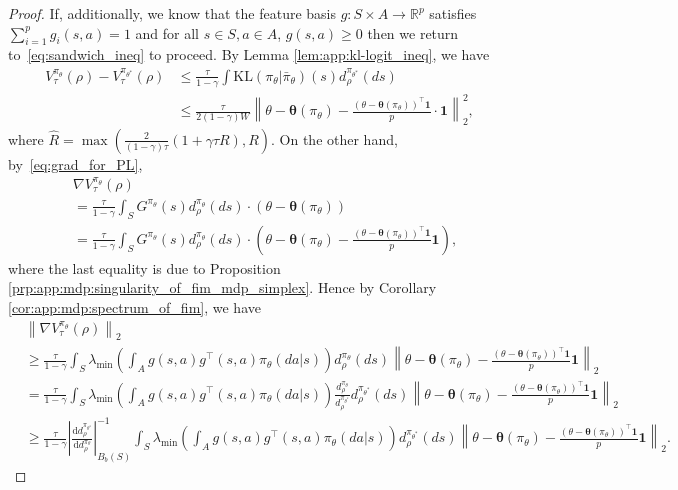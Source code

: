 \documentclass{amsart}
\theoremstyle{definition}
\begin{document}
\begin{proof}
If, additionally,  we know that the feature basis $g:S\times A \to \mathbb R^p$ satisfies $\sum_{i=1}^p g_i(s,a) = 1 $ and for all $s \in S,a \in A$, $g(s,a) \geq 0$ then we return to~\eqref{eq:sandwich_ineq} to proceed.
By Lemma \ref{lem:app:kl-logit_ineq}, we have
\begin{align*}
V_\tau^{\pi_\theta}(\rho) - V_\tau^{\pi_{\theta^*}}(\rho) & \leq \frac{\tau}{1-\gamma}\int \mathrm{KL}(\pi_\theta | \bar{\pi}_{\theta})(s)d_\rho^{\pi_{\theta^*}}(ds)\\
& \leq \frac{\tau }{2(1-\gamma)W}\left\|\theta - \boldsymbol{\theta}(\pi_\theta) - \frac{(\theta - \boldsymbol{\theta}(\pi_\theta))^\top \textbf{1}}{p} \cdot \textbf{1}\right\|_{2}^2,
\end{align*}
where $\hat{R} = \max\left(\frac{2}{(1-\gamma)\tau} \left(1+\gamma\tau R\right), R\right)$.
On the other hand, by~\eqref{eq:grad_for_PL},
\begin{align*}
& \nabla V_\tau^{\pi_\theta}(\rho) \\
& = \frac{\tau}{1-\gamma} \int_{S} G^{\pi_\theta}(s)d_{\rho}^{\pi_{\theta}}(ds)\cdot(\theta -\boldsymbol{\theta}(\pi_\theta))\\
& = \frac{\tau}{1-\gamma} \int_{S} G^{\pi_\theta}(s)d_{\rho}^{\pi_{\theta}}(ds)\cdot\left(\theta -\boldsymbol{\theta}(\pi_\theta)- \frac{(\theta - \boldsymbol{\theta}(\pi_\theta))^\top\textbf{1}}{p}\textbf{1}\right),
\end{align*}
where the last equality is due to Proposition \ref{prp:app:mdp:singularity_of_fim_mdp_simplex}. 
Hence by Corollary \ref{cor:app:mdp:spectrum_of_fim}, we have
{\small
\begin{align*}
& \left\|\nabla V_\tau^{\pi_\theta}(\rho)\right\|_2 \\
& \geq \frac{\tau }{1-\gamma}\int_{S}\lambda_{\min}\left(\int_{A} g(s,a)g^\top(s,a)\pi_\theta(da|s)\right)d^{\pi_{\theta}}_{\rho}(ds)\left\|\theta - \boldsymbol{\theta}(\pi_\theta) - \frac{(\theta - \boldsymbol{\theta}(\pi_\theta))^\top\textbf{1}}{p}\textbf{1}\right\|_2 \\
& = \frac{\tau }{1-\gamma}\int_{S}\lambda_{\min}\left(\int_{A} g(s,a)g^\top(s,a)\pi_\theta(da|s)\right)\frac{d^{\pi_{\theta}}_{\rho}}{d^{\pi_{\theta^*}}_{\rho}}d^{\pi_{\theta^*}}_{\rho}(ds)\left\|\theta - \boldsymbol{\theta}(\pi_\theta) - \frac{(\theta - \boldsymbol{\theta}(\pi_\theta))^\top\textbf{1}}{p}\textbf{1}\right\|_2 \\
& \geq \frac{\tau }{1-\gamma}\left|\frac{\text{d}d^{\pi_{\theta^*}}_{\rho}}{\text{d}d^{\pi_{\theta}}_{\rho}}\right|_{B_b(S)}^{-1}\int_{S}\lambda_{\min}\left(\int_{A} g(s,a)g^\top(s,a)\pi_\theta(da|s)\right)d^{\pi_{\theta^*}}_{\rho}(ds)\left\|\theta - \boldsymbol{\theta}(\pi_\theta) - \frac{(\theta - \boldsymbol{\theta}(\pi_\theta))^\top\textbf{1}}{p}\textbf{1}\right\|_2.

\end{align*}}
\end{proof}
\end{document}

